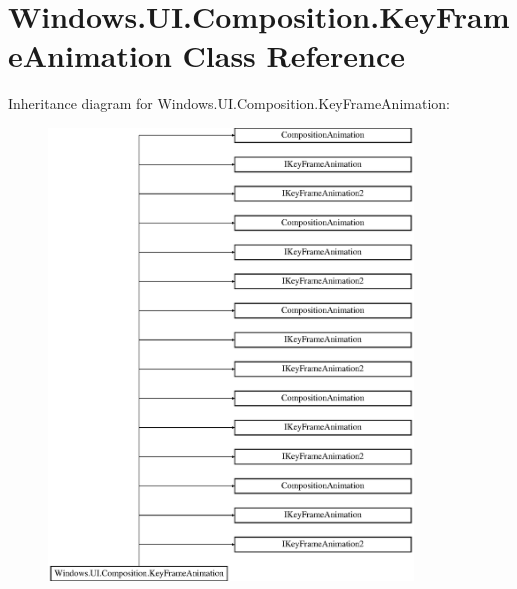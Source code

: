 \hypertarget{class_windows_1_1_u_i_1_1_composition_1_1_key_frame_animation}{}\section{Windows.\+U\+I.\+Composition.\+Key\+Frame\+Animation Class Reference}
\label{class_windows_1_1_u_i_1_1_composition_1_1_key_frame_animation}
Inheritance diagram for Windows.\+U\+I.\+Composition.\+Key\+Frame\+Animation\+:\begin{figure}[H]
\begin{center}
\leavevmode
\includegraphics[height=12.000000cm]{class_windows_1_1_u_i_1_1_composition_1_1_key_frame_animation}
\end{center}
\end{figure}
